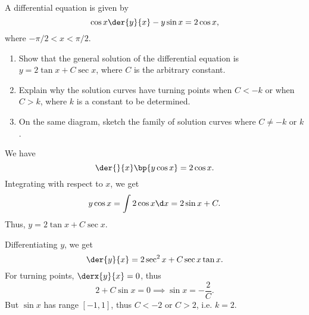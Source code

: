\begin{problem}
    A differential equation is given by \[\cos x \der{y}{x} - y \sin x = 2 \cos x,\] where $-\pi/2 < x < \pi/2$.

    \begin{enumerate}
        \item Show that the general solution of the differential equation is $y = 2 \tan x + C \sec x$, where $C$ is the arbitrary constant.
        \item Explain why the solution curves have turning points when $C < -k$ or when $C > k$, where $k$ is a constant to be determined.
        \item On the same diagram, sketch the family of solution curves where $C \neq -k$ or $k$.
    \end{enumerate}
\end{problem}
\begin{solution}
    \begin{ppart}
        We have \[\der{}{x} \bp{y \cos x} = 2\cos x.\] Integrating with respect to $x$, we get \[y \cos x = \int 2 \cos x \d x = 2\sin x + C.\] Thus, $y = 2 \tan x + C \sec x$.
    \end{ppart}
    \begin{ppart}
        Differentiating $y$, we get \[\der{y}{x} = 2\sec^2 x + C \sec x \tan x.\] For turning points, $\derx{y}{x} = 0$, thus \[2 + C \sin x = 0 \implies \sin x = -\frac{2}{C}.\] But $\sin x$ has range $[-1, 1]$, thus $C < -2$ or $C > 2$, i.e. $k = 2$.
    \end{ppart}
    \begin{ppart}
        \begin{figure}[H]
        \centering
    \end{figure}
    \end{ppart}
\end{solution}

